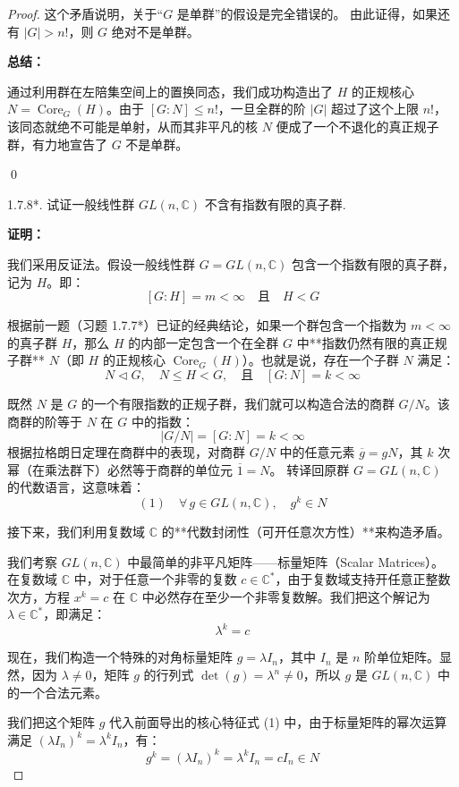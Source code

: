 \documentclass[]{article}
\begin{document}
\begin{proof}
这个矛盾说明，关于“$G$ 是单群”的假设是完全错误的。
由此证得，如果还有 $|G| > n!$，则 $G$ 绝对不是单群。

\bigskip
\noindent \textbf{总结：} 

通过利用群在左陪集空间上的置换同态，我们成功构造出了 $H$ 的正规核心 $N = \operatorname{Core}_G(H)$。由于 $[G:N] \leqslant n!$，一旦全群的阶 $|G|$ 超过了这个上限 $n!$，该同态就绝不可能是单射，从而其非平凡的核 $N$ 便成了一个不退化的真正规子群，有力地宣告了 $G$ 不是单群。

\qed

1.7.8*. 试证一般线性群 $GL(n, \mathbb{C})$ 不含有指数有限的真子群. 

\bigskip
\noindent \textbf{证明：} 

我们采用反证法。假设一般线性群 $G = GL(n, \mathbb{C})$ 包含一个指数有限的真子群，记为 $H$。即：
\[ [G:H] = m < \infty \quad \text{且} \quad H < G \]

根据前一题（习题 1.7.7*）已证的经典结论，如果一个群包含一个指数为 $m < \infty$ 的真子群 $H$，那么 $H$ 的内部一定包含一个在全群 $G$ 中**指数仍然有限的真正规子群** $N$（即 $H$ 的正规核心 $\operatorname{Core}_G(H)$）。也就是说，存在一个子群 $N$ 满足：
\[ N \triangleleft G, \quad N \leqslant H < G, \quad \text{且} \quad [G:N] = k < \infty \]

既然 $N$ 是 $G$ 的一个有限指数的正规子群，我们就可以构造合法的商群 $G/N$。该商群的阶等于 $N$ 在 $G$ 中的指数：
\[ |G/N| = [G:N] = k < \infty \]
根据拉格朗日定理在商群中的表现，对商群 $G/N$ 中的任意元素 $\overline{g} = gN$，其 $k$ 次幂（在乘法群下）必然等于商群的单位元 $\overline{1} = N$。
转译回原群 $G = GL(n, \mathbb{C})$ 的代数语言，这意味着：
\[ (1) \quad \forall \, g \in GL(n, \mathbb{C}), \quad g^k \in N \]

\bigskip
接下来，我们利用复数域 $\mathbb{C}$ 的**代数封闭性（可开任意次方性）**来构造矛盾。

我们考察 $GL(n, \mathbb{C})$ 中最简单的非平凡矩阵——标量矩阵（Scalar Matrices）。
在复数域 $\mathbb{C}$ 中，对于任意一个非零的复数 $c \in \mathbb{C}^*$，由于复数域支持开任意正整数次方，方程 $x^k = c$ 在 $\mathbb{C}$ 中必然存在至少一个非零复数解。我们把这个解记为 $\lambda \in \mathbb{C}^*$，即满足：
\[ \lambda^k = c \]

现在，我们构造一个特殊的对角标量矩阵 $g = \lambda I_n$，其中 $I_n$ 是 $n$ 阶单位矩阵。显然，因为 $\lambda \neq 0$，矩阵 $g$ 的行列式 $\det(g) = \lambda^n \neq 0$，所以 $g$ 是 $GL(n, \mathbb{C})$ 中的一个合法元素。

我们把这个矩阵 $g$ 代入前面导出的核心特征式 (1) 中，由于标量矩阵的幂次运算满足 $(\lambda I_n)^k = \lambda^k I_n$，有：
\[ g^k = (\lambda I_n)^k = \lambda^k I_n = c I_n \in N \]


\end{proof}
\end{document}
